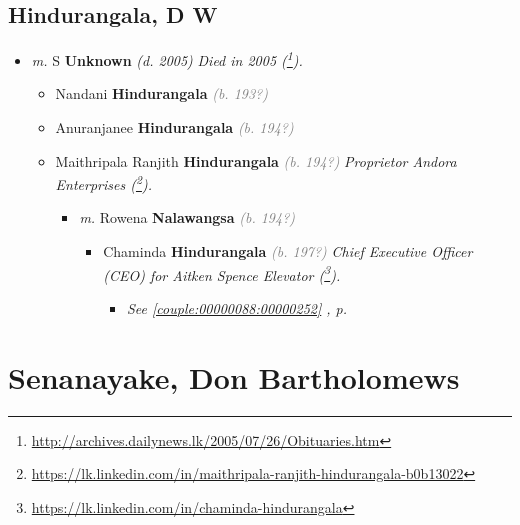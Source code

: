 \documentclass[10pt, openany]{book}
\begin{document}
\chapter{Hindurangala, D W}
\label{00002555}
\textcolor{slmaroon}{\textit{}}
\begin{itemize}
\item{\textit{m.} S \textbf{Unknown} \textcolor{slorange}{\textit{(d. 2005)}} \textcolor{slmaroon}{\textit{Died in 2005 (\footnote{\url{http://archives.dailynews.lk/2005/07/26/Obituaries.htm}}).}}   \label{couple:00002555:00002556} \begin{itemize}
\item{Nandani \textbf{Hindurangala} \textcolor{gray}{\textit{(b. 193?)}}
 }
\item{Anuranjanee \textbf{Hindurangala} \textcolor{gray}{\textit{(b. 194?)}}
 }
\item{Maithripala Ranjith \textbf{Hindurangala} \textcolor{gray}{\textit{(b. 194?)}} \textcolor{slmaroon}{\textit{Proprietor Andora Enterprises (\footnote{\url{https://lk.linkedin.com/in/maithripala-ranjith-hindurangala-b0b13022}}).}}
\begin{itemize}
\item{\textit{m.} Rowena \textbf{Nalawangsa} \textcolor{gray}{\textit{(b. 194?)}}   \label{couple:00000253:00000905} \begin{itemize}
\item{Chaminda \textbf{Hindurangala} \textcolor{gray}{\textit{(b. 197?)}} \textcolor{slmaroon}{\textit{Chief Executive Officer (CEO) for Aitken Spence Elevator (\footnote{\url{https://lk.linkedin.com/in/chaminda-hindurangala}}).}}
\begin{itemize}
\item{\textcolor{slteal}{\textit{See  \autoref{couple:00000088:00000252} \textit{, p. \pageref{couple:00000088:00000252} }}}}
\end{itemize}
 }
\end{itemize}}
\end{itemize}
  }
\end{itemize}}
\end{itemize}
  
\part{Senanayake, Don Bartholomews}
\end{document}
